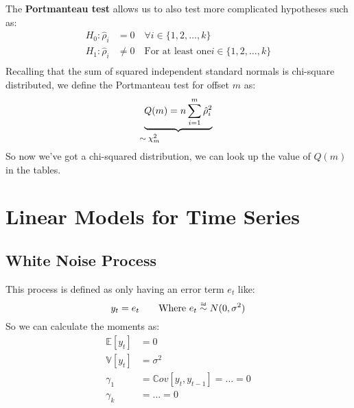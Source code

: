The \textbf{Portmanteau test} allows us to also test more complicated
hypotheses such as:
\begin{equation*}
    \begin{aligned}
        H_0: \hat{\rho}_i &= 0 \quad \forall i \in \{1, 2, \dots, k\} \\
        H_1: \hat{\rho}_i &\ne 0 \quad \text{For at least one} i \in \{1, 2, \dots, k\} \\
    \end{aligned}
\end{equation*}
Recalling that the sum of squared independent standard normals is
chi-square distributed, we define the Portmanteau test for offset $m$ as:
\begin{equation*}
    \explain{Q(m) = n \sum_{i=1}^{m} \hat{\rho}_i^2}{$\sim \chi^2_m$}
\end{equation*}
So now we've got a chi-squared distribution, we can look up the value of $Q(m)$
in the tables.

\section{Linear Models for Time Series}
\subsection{White Noise Process}
This process is defined as only having an error term $e_t$ like:
 \begin{equation*}
     y_t = e_t \qquad \text{Where $e_t \iid N(0, \sigma^2)$}
\end{equation*}
So we can calculate the moments as:
\begin{equation*}
    \begin{aligned}
        \mathbb{E}[y_t] &= 0 \\
        \mathbb{V}[y_t] &= \sigma^2 \\
        \gamma_1 &= \mathbb{C}ov[y_t, y_{t-1}] = \dots = 0 \\
        \gamma_k &= \dots = 0 \\
    \end{aligned}
\end{equation*}

